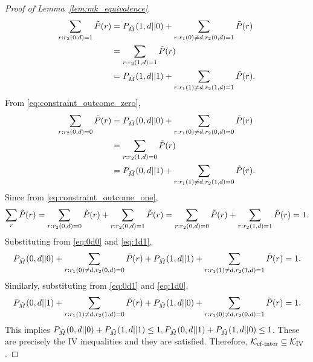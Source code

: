 \begin{proof}[Proof of Lemma~\ref{lem:mk_equivalence}]
\begin{align}
    \sum\limits_{r: r_2{\left({0,d}\right)}=1} \tilde{P}(r) &= P_{\tilde{M}}(1,d || 0) + \sum\limits_{r: r_1(0) \neq d, r_2{\left({0,d}\right)}=1} \tilde{P}(r) \label{eq:1d0}\\
    &= \sum\limits_{r: r_2{\left({1,d}\right)}=1} \tilde{P}(r) \nonumber \\
    &= P_{\tilde{M}}(1,d || 1) + \sum\limits_{r: r_1(1) \neq d, r_2{\left({1,d}\right)}=1} \tilde{P}(r) \label{eq:1d1}.
\end{align}
From \eqref{eq:constraint_outcome_zero}, 
\begin{align}
    \sum\limits_{r: r_2{\left({0,d}\right)}=0} \tilde{P}(r) &= P_{\tilde{M}}(0,d || 0) + \sum\limits_{r: r_1(0) \neq d, r_2{\left({0,d}\right)}=0} \tilde{P}(r) \label{eq:0d0} \\
    &= \sum\limits_{r: r_2{\left({1,d}\right)}=0} \tilde{P}(r) \nonumber \\
    &= P_{\tilde{M}}(0,d || 1) + \sum\limits_{r: r_1(1) \neq d, r_2{\left({1,d}\right)}=0} \tilde{P}(r) \label{eq:0d1}.
\end{align}
Since from \eqref{eq:constraint_outcome_one},
\begin{equation*}
    \sum\limits_{r} \tilde{P}{\left({r}\right)} = \sum\limits_{r: r_2{\left({0,d}\right)}=0} \tilde{P}(r) + \sum\limits_{r: r_2{\left({0,d}\right)}=1} \tilde{P}(r) = \sum\limits_{r: r_2{\left({0,d}\right)}=0} \tilde{P}(r) + \sum\limits_{r: r_2{\left({1,d}\right)}=1} \tilde{P}(r) = 1.
\end{equation*}
Substituting from \eqref{eq:0d0} and \eqref{eq:1d1}, 
\begin{equation*}
    P_{\tilde{M}}(0,d || 0) + \sum\limits_{r: r_1(0) \neq d, r_2{\left({0,d}\right)}=0} \tilde{P}(r) + P_{\tilde{M}}(1,d || 1) + \sum\limits_{r: r_1(1) \neq d, r_2{\left({1,d}\right)}=1} \tilde{P}(r) =1. 
\end{equation*}
Similarly, substituting from \eqref{eq:0d1} and \eqref{eq:1d0}, 
\begin{equation*}
    P_{\tilde{M}}(0,d || 1) + \sum\limits_{r: r_1(1) \neq d, r_2{\left({1,d}\right)}=0} \tilde{P}(r)+ P_{\tilde{M}}(1,d || 0) + \sum\limits_{r: r_1(0) \neq d, r_2{\left({0,d}\right)}=1} \tilde{P}(r)=1. 
\end{equation*}
 This implies $P_{\tilde{M}}(0,d || 0) + P_{\tilde{M}}(1,d || 1) \leq 1, P_{\tilde{M}}(0,d || 1) + P_{\tilde{M}}(1,d || 0) \leq 1$. These are precisely the IV inequalities and they are satisfied. Therefore, ${\cal K}_{\text{cf-inter}} \subseteq \mathcal{K}_{\text{IV}}$.


\end{proof}
